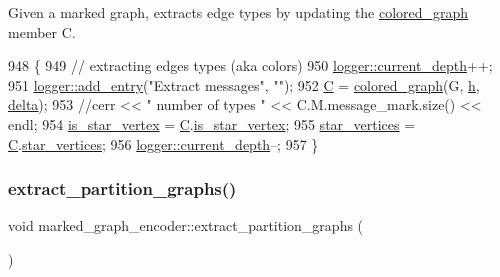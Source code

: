 Given a marked graph, extracts edge types by updating the \hyperlink{classcolored__graph}{colored\+\_\+graph} member C. 


\begin{DoxyCode}
948 \{
949   \textcolor{comment}{// extracting edges types (aka colors)}
950   \hyperlink{classlogger_a9d29b49bd318a719a8e85b59eac54fe0}{logger::current\_depth}++;
951   \hyperlink{classlogger_a710163deb17bc81f70d53d285b8ac9ac}{logger::add\_entry}(\textcolor{stringliteral}{"Extract messages"}, \textcolor{stringliteral}{""});
952   \hyperlink{classmarked__graph__encoder_af82bc0653414091291cb75553a407bdb}{C} = \hyperlink{classcolored__graph}{colored\_graph}(G, \hyperlink{classmarked__graph__encoder_ae7f8872c57d2d64e4ca6cc47387b9b58}{h}, \hyperlink{classmarked__graph__encoder_a29dcf42526b12cf7964a556bb1025c9b}{delta});
953   \textcolor{comment}{//cerr << " number of types " << C.M.message\_mark.size() << endl;}
954   \hyperlink{classmarked__graph__encoder_ac36f6c2430af6fa4d20584569859bb59}{is\_star\_vertex} = \hyperlink{classmarked__graph__encoder_af82bc0653414091291cb75553a407bdb}{C}.\hyperlink{classcolored__graph_ad41163e970530c7e45878d299f0dc961}{is\_star\_vertex};
955   \hyperlink{classmarked__graph__encoder_a08fdf6fcd7dcd8c5d1667f2d7ff06c2c}{star\_vertices} = \hyperlink{classmarked__graph__encoder_af82bc0653414091291cb75553a407bdb}{C}.\hyperlink{classcolored__graph_ab7ee8d717abde7ad7467ef695038f574}{star\_vertices};
956   \hyperlink{classlogger_a9d29b49bd318a719a8e85b59eac54fe0}{logger::current\_depth}--;
957 \}
\end{DoxyCode}
\mbox{\label{classmarked__graph__encoder_a60b0038c57bd8fa2f5cb3f0b6999c4f3}} 
\subsubsection{\texorpdfstring{extract\+\_\+partition\+\_\+graphs()}{extract\_partition\_graphs()}}
{\footnotesize\ttfamily void marked\+\_\+graph\+\_\+encoder\+::extract\+\_\+partition\+\_\+graphs (\begin{DoxyParamCaption}{ }\end{DoxyParamCaption})\hspace{0.3cm}{\ttfamily [private]}}



